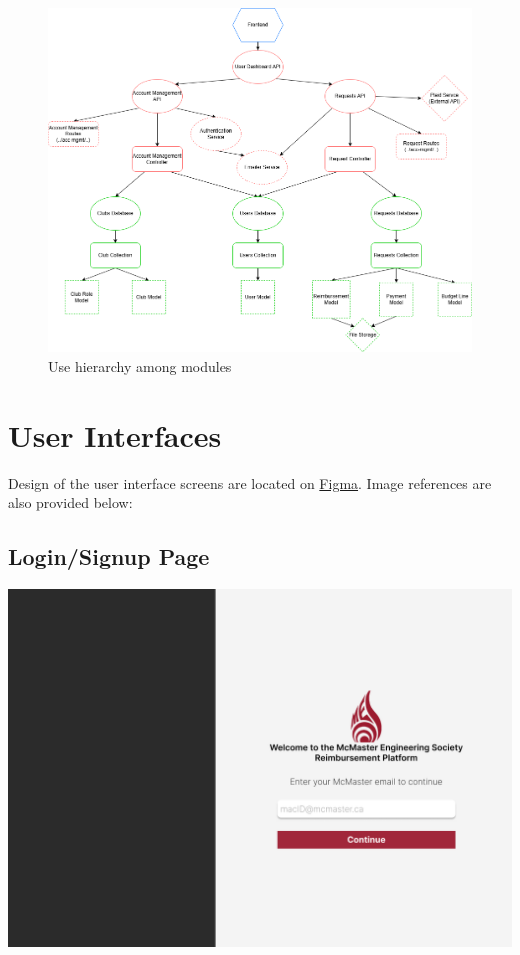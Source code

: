 \documentclass[12pt, titlepage]{article}
\begin{document}
\begin{figure}[H]
\includegraphics[width=1.1\textwidth]{imgs/UsesHierarchy.png}
\caption{Use hierarchy among modules}
\label{FigUH}
\end{figure}


\newpage

\section{User Interfaces}

Design of the user interface screens are located on \href{https://www.figma.com/design/44vRz90xLocsOkyLXjaODB/MES-Finance-Platform?node-id=0-1&t=uPGJjQawfH5iIdCy-1}{Figma}. Image references are also provided below:

\subsection{Login/Signup Page}
\includegraphics[]{imgs/LoginSignupPage.png}
\end{document}
